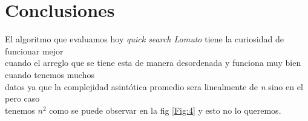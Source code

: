 \documentclass{article}
\begin{document}
\section{Conclusiones}\label{Conclusiones}				%
El algoritmo que evaluamos hoy \textit{quick search Lomuto} tiene la curiosidad de funcionar mejor\\
cuando el arreglo que se tiene esta de manera desordenada y funciona muy bien cuando tenemos muchos\\
datos ya que la complejidad asintótica promedio sera linealmente de \textit{n} sino en el pero caso\\
tenemos $\textit{n}^2$ como se puede observar en la fig \ref{Fig:4} y esto no lo queremos.
\end{document}
